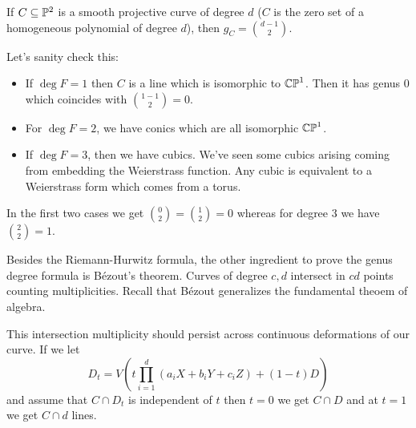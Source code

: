 \documentclass[12pt]{memoir}
\begin{document}
\begin{Prop}
    If $C\subseteq\mathbb{P}^2$ is a smooth projective curve of degree $d$ ($C$ is the zero set of a homogeneous polynomial of degree $d$), then $g_C=\binom{d-1}{2}$.
\end{Prop}

Let's sanity check this:
\begin{itemize}
    \item If $\deg F=1$ then $C$ is a line which is isomorphic to $\mathbb{CP}^1$. Then it has genus 0 which coincides with $\binom{1-1}{2}=0$.
    \item For $\deg F=2$, we have conics which are all isomorphic $\mathbb{CP}^1$. 
    \item If $\deg F=3$, then we have cubics. We've seen some cubics arising coming from embedding the Weierstrass function. Any cubic is equivalent to a Weierstrass form which comes from a torus.
\end{itemize}
In the first two cases we get $\binom{0}{2}=\binom{1}{2}=0$ whereas for degree $3$ we have $\binom{2}{2}=1$.\par
Besides the Riemann-Hurwitz formula, the other ingredient to prove the genus degree formula is Bézout's theorem. Curves of degree $c,d$ intersect in $cd$ points counting multiplicities. Recall that Bézout generalizes the fundamental theoem of algebra.\par
This intersection multiplicity should persist across continuous deformations of our curve. If we let 
$$D_t=V\left(t\prod_{i=1}^{d}(a_iX+b_iY+c_iZ)+(1-t)D\right)$$
and assume that $C\cap D_t$ is independent of $t$ then $t=0$ we get $C\cap D$ and at $t=1$ we get $C\cap d$ lines.

\ifx\nextra\undefined
\printindex
\else\fi
\nocite{*}


\end{document}

